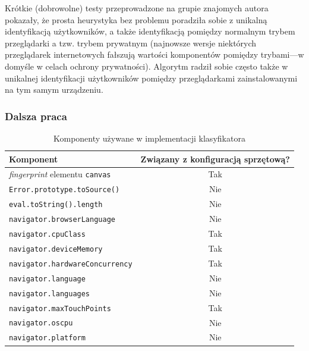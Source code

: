 Krótkie (dobrowolne) testy przeprowadzone na grupie znajomych autora pokazały,
że prosta heurystyka bez problemu poradziła sobie z unikalną identyfikacją
użytkowników, a także identyfikacją pomiędzy normalnym trybem przeglądarki a
tzw. trybem prywatnym (najnowsze wersje niektórych przeglądarek internetowych
fałszują wartości komponentów pomiędzy trybami---w domyśle w celach ochrony
prywatności). Algorytm radził sobie często także w unikalnej identyfikacji
użytkowników pomiędzy przeglądarkami zainstalowanymi na tym samym urządzeniu.

\subsubsection{Dalsza praca}

\begin{table}
	\centering
	\caption{Komponenty używane w implementacji klasyfikatora}
	\begin{tabular}{|l|c|}
		\hline
		Komponent                                   & Związany z konfiguracją sprzętową? \\
		\hline
		\emph{fingerprint} elementu \texttt{canvas} & Tak                                    \\
		\texttt{Error.prototype.toSource()}         & Nie                                    \\
		\texttt{eval.toString().length}             & Nie                                    \\
		\texttt{navigator.browserLanguage}          & Nie                                    \\
		\texttt{navigator.cpuClass}                 & Tak                                    \\
		\texttt{navigator.deviceMemory}             & Tak                                    \\
		\texttt{navigator.hardwareConcurrency}      & Tak                                    \\
		\texttt{navigator.language}                 & Nie                                    \\
		\texttt{navigator.languages}                & Nie                                    \\
		\texttt{navigator.maxTouchPoints}           & Tak                                    \\
		\texttt{navigator.oscpu}                    & Nie                                    \\
		\texttt{navigator.platform}                 & Nie                                    \\

\end{tabular}
\end{table}
